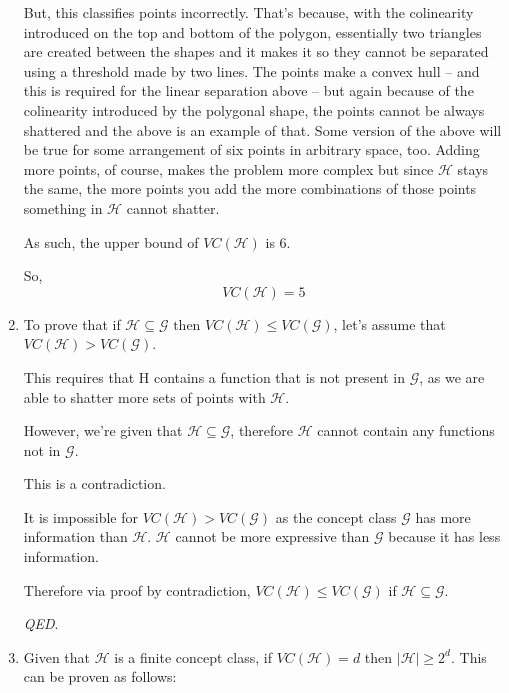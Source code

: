 \documentclass{article}
\begin{document}
\begin{enumerate}
        But, this classifies points incorrectly. That's because, with the colinearity introduced on the top and bottom of the polygon, essentially two triangles are created between the shapes and it makes it so they cannot be separated using a threshold made by two lines. The points make a convex hull -- and this is required for the linear separation above -- but again because of the colinearity introduced by the polygonal shape, the points cannot be always shattered and the above is an example of that. Some version of the above will be true for some arrangement of six points in arbitrary space, too. Adding more points, of course, makes the problem more complex but since $\mathcal{H}$ stays the same, the more points you add the more combinations of those points something in $\mathcal{H}$ cannot shatter. 
        
        As such, the upper bound of $VC(\mathcal{H})$ is 6. 
        
        So,
        \begin{equation*}
            VC(\mathcal{H}) = 5
        \end{equation*}  
    
    \item 
        To prove that if $\mathcal{H} \subseteq \mathcal{G} \text{  then   } VC(\mathcal{H}) \leq VC(\mathcal{G})$, let's assume that $VC(\mathcal{H}) > VC(\mathcal{G})$. 
        
        This requires that H contains a function that is not present in $\mathcal{G}$, as we are able to shatter more sets of points with $\mathcal{H}$. 
        
        However, we're given that $\mathcal{H} \subseteq \mathcal{G}$, therefore $\mathcal{H}$ cannot contain any functions not in $\mathcal{G}$. 
        
        This is a contradiction. 
        
        It is impossible for $VC(\mathcal{H}) > VC(\mathcal{G})$ as the concept class $\mathcal{G}$ has more information than $\mathcal{H}$. $\mathcal{H}$ cannot be more expressive than $\mathcal{G}$ because it has less information. 
        
        Therefore via proof by contradiction, $VC(\mathcal{H}) \leq VC(\mathcal{G})$ if $\mathcal{H} \subseteq \mathcal{G}$. 
        
        \textit{QED}.
        
    \item 
        Given that $\mathcal{H}$ is a finite concept class, if $VC(\mathcal{H}) = d$ then $|\mathcal{H}| \geq 2^d$. This can be proven as follows: 
        

\end{enumerate}
\end{document}
